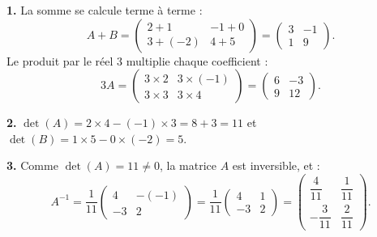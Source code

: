 \documentclass[11pt]{article}
\begin{document}
\begin{corrige}
\textbf{1.} La somme se calcule terme à terme :
\[ A + B = \begin{pmatrix} 2+1 & -1+0 \\ 3+(-2) & 4+5 \end{pmatrix} = \begin{pmatrix} 3 & -1 \\ 1 & 9 \end{pmatrix}. \]
Le produit par le réel $3$ multiplie chaque coefficient :
\[ 3A = \begin{pmatrix} 3\times 2 & 3\times(-1) \\ 3\times 3 & 3\times 4 \end{pmatrix} = \begin{pmatrix} 6 & -3 \\ 9 & 12 \end{pmatrix}. \]

\textbf{2.} $\det(A) = 2\times 4 - (-1)\times 3 = 8 + 3 = 11$ et $\det(B) = 1\times 5 - 0\times(-2) = 5$.

\textbf{3.} Comme $\det(A) = 11 \neq 0$, la matrice $A$ est inversible, et :
\[ A^{-1} = \frac{1}{11}\begin{pmatrix} 4 & -(-1) \\ -3 & 2 \end{pmatrix} = \frac{1}{11}\begin{pmatrix} 4 & 1 \\ -3 & 2 \end{pmatrix} = \begin{pmatrix} \dfrac{4}{11} & \dfrac{1}{11} \\[6pt] -\dfrac{3}{11} & \dfrac{2}{11} \end{pmatrix}. \]
\end{corrige}
\end{document}
